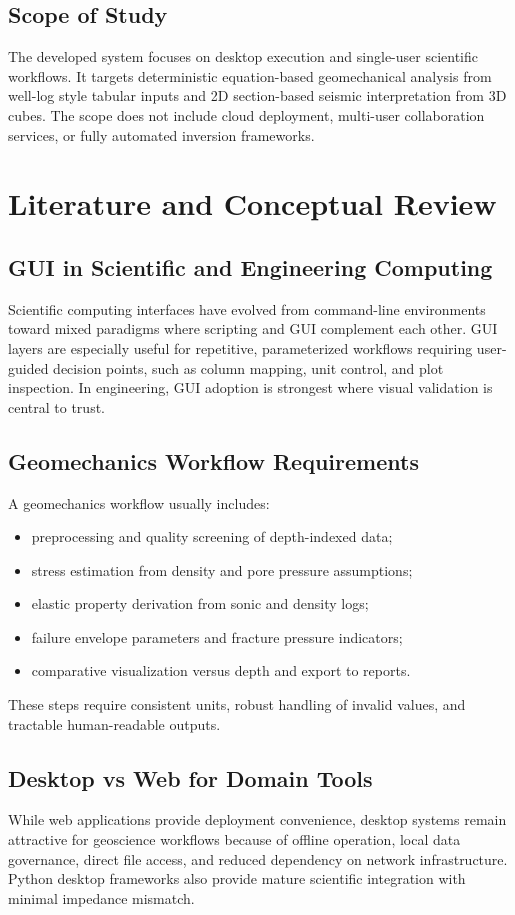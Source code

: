 \documentclass[12pt,a4paper]{report}
\begin{document}
\section{Scope of Study}
The developed system focuses on desktop execution and single-user scientific workflows. It targets deterministic equation-based geomechanical analysis from well-log style tabular inputs and 2D section-based seismic interpretation from 3D cubes. The scope does not include cloud deployment, multi-user collaboration services, or fully automated inversion frameworks.

\chapter{Literature and Conceptual Review}
\section{GUI in Scientific and Engineering Computing}
Scientific computing interfaces have evolved from command-line environments toward mixed paradigms where scripting and GUI complement each other. GUI layers are especially useful for repetitive, parameterized workflows requiring user-guided decision points, such as column mapping, unit control, and plot inspection. In engineering, GUI adoption is strongest where visual validation is central to trust.

\section{Geomechanics Workflow Requirements}
A geomechanics workflow usually includes:
\begin{itemize}
    \item preprocessing and quality screening of depth-indexed data;
    \item stress estimation from density and pore pressure assumptions;
    \item elastic property derivation from sonic and density logs;
    \item failure envelope parameters and fracture pressure indicators;
    \item comparative visualization versus depth and export to reports.
\end{itemize}
These steps require consistent units, robust handling of invalid values, and tractable human-readable outputs.

\section{Desktop vs Web for Domain Tools}
While web applications provide deployment convenience, desktop systems remain attractive for geoscience workflows because of offline operation, local data governance, direct file access, and reduced dependency on network infrastructure. Python desktop frameworks also provide mature scientific integration with minimal impedance mismatch.
\end{document}
